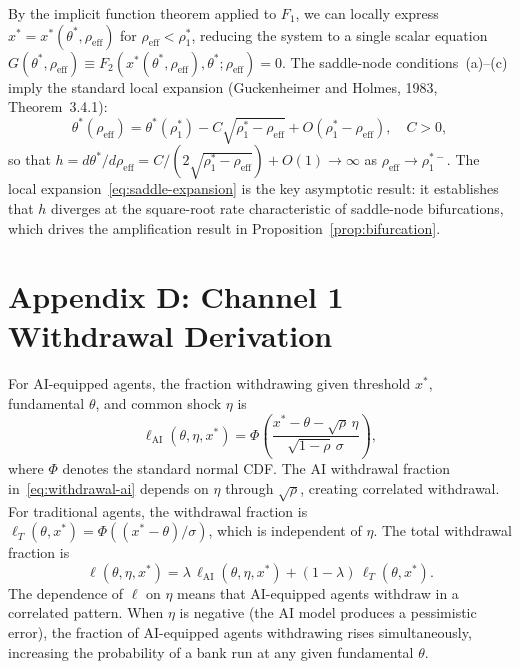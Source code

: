 By the implicit function theorem applied to $F_1$, we can locally express $x^* = x^*(\theta^*, \rho_{\text{eff}})$ for $\rho_{\text{eff}} < \rho_1^*$, reducing the system to a single scalar equation $G(\theta^*, \rho_{\text{eff}}) \equiv F_2(x^*(\theta^*, \rho_{\text{eff}}), \theta^*; \rho_{\text{eff}}) = 0$. The saddle-node conditions~(a)--(c) imply the standard local expansion (Guckenheimer and Holmes, 1983, Theorem~3.4.1):
\begin{equation}\label{eq:saddle-expansion}
  \theta^*(\rho_{\text{eff}}) = \theta^*(\rho_1^*) - C\sqrt{\rho_1^* - \rho_{\text{eff}}} + O(\rho_1^* - \rho_{\text{eff}}), \quad C > 0,
\end{equation}
so that $h = d\theta^*/d\rho_{\text{eff}} = C/(2\sqrt{\rho_1^* - \rho_{\text{eff}}}) + O(1) \to \infty$ as $\rho_{\text{eff}} \to \rho_1^{*-}$. The local expansion~\eqref{eq:saddle-expansion} is the key asymptotic result: it establishes that $h$ diverges at the square-root rate characteristic of saddle-node bifurcations, which drives the amplification result in Proposition~\ref{prop:bifurcation}.

\section*{Appendix D: Channel 1 Withdrawal Derivation}\label{app:withdrawal}

For AI-equipped agents, the fraction withdrawing given threshold $x^*$, fundamental $\theta$, and common shock $\eta$ is
\begin{equation}\label{eq:withdrawal-ai}
  \ell_{\text{AI}}(\theta, \eta, x^*) = \Phi\!\left(\frac{x^* - \theta - \sqrt{\rho}\,\eta}{\sqrt{1-\rho}\,\sigma}\right),
\end{equation}
where $\Phi$ denotes the standard normal CDF. The AI withdrawal fraction in~\eqref{eq:withdrawal-ai} depends on $\eta$ through $\sqrt{\rho}$, creating correlated withdrawal. For traditional agents, the withdrawal fraction is $\ell_T(\theta, x^*) = \Phi((x^*-\theta)/\sigma)$, which is independent of $\eta$. The total withdrawal fraction is
\begin{equation}\label{eq:withdrawal-total}
  \ell(\theta, \eta, x^*) = \lambda\,\ell_{\text{AI}}(\theta, \eta, x^*) + (1-\lambda)\,\ell_T(\theta, x^*).
\end{equation}
The dependence of $\ell$ on $\eta$ means that AI-equipped agents withdraw in a correlated pattern. When $\eta$ is negative (the AI model produces a pessimistic error), the fraction of AI-equipped agents withdrawing rises simultaneously, increasing the probability of a bank run at any given fundamental $\theta$.
